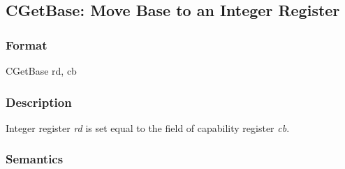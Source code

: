 \clearpage
{}
{}
\subsection*{CGetBase: Move Base to an Integer Register}

\subsubsection*{Format}

CGetBase rd, cb

\begin{center}
\end{center}

\subsubsection*{Description}

Integer register \textit{rd} is set equal to the \cbase{} field of capability
register \textit{cb}.

\subsubsection*{Semantics}



